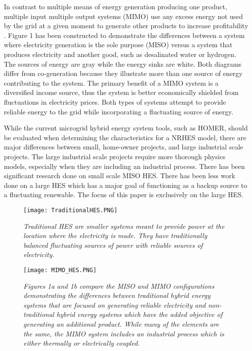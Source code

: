 \documentclass{article}                                                                           %
\begin{document}
\begin{linenumbers}
In contrast to multiple means of energy generation producing one product, multiple input multiple output systems (MIMO) use any excess energy not used by the grid at a given moment to generate other products to increase profitability \cite {Garcia2013}. Figure 1 has been constructed to demonstrate the differences between a system where electricity generation is the sole purpose (MISO) versus a system that produces electricity and another good, such as desalinated water or hydrogen. The sources of energy are gray while the energy sinks are white. Both diagrams differ from co-generation because they illustrate more than one source of energy contributing to the system. The primary benefit of a MIMO system is a diversified income source, thus the system is better economically shielded from fluctuations in electricity prices. Both types of systems attempt to provide reliable energy to the grid while incorporating a fluctuating source of energy.

 While the current microgrid hybrid energy system tools, such as HOMER, should be evaluated when determining the characteristics for a NRHES model, there are major differences between small, home-owner projects, and large industrial scale projects. The large industrial scale projects require more thorough physics models, especially when they are including an industrial process. There has been significant research done on small scale MISO HES.  There has been less work done on a large HES which has a major goal of functioning as a backup source to a fluctuating renewable. The focus of this paper is exclusively on the large HES.

 \begin{subfigures}
\begin{figure*}[h!]
\centering
\texttt{[image: TraditionalHES.PNG]}
\caption{\small \sl Traditional HES are smaller systems meant to provide power at the location where the electricity is made.  They have traditionally balanced fluctuating sources of power with reliable sources of electricity.}
\end{figure*}

\begin{figure*}[h!]
\centering
\texttt{[image: MIMO\_HES.PNG]}
\caption{\small \sl Figures 1a and 1b compare the MISO and MIMO configurations demonstrating the differences between traditional hybrid energy systems that are focused on generating reliable electricity and non-traditional hybrid energy systems which have the added objective of generating an additional product.  While many of the elements are the same, the MIMO system includes an industrial process which is either thermally or electrically coupled.}
\end{figure*}
\end{subfigures}


\end{linenumbers}
\end{document}
